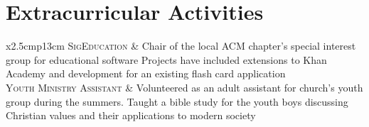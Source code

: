 \documentclass[letterpaper,10pt]{article}
\newcommand{\tbl}{2.5cm}
\newcommand{\tbr}{13cm}
\begin{document}
\section{Extracurricular Activities}
\begin{tabular}{x{\tbl}p{\tbr}}
    \textsc{SigEducation}
    & Chair of the local ACM chapter's special interest group for educational software \newline
    Projects have included extensions to Khan Academy and development for an
    existing flash card application \newline \\

    \textsc{Youth Ministry Assistant}
    & Volunteered as an adult assistant for church's youth group during the summers. \newline
    Taught a bible study for the youth boys discussing Christian values and their applications to modern society \newline \\

\end{tabular}




\end{document}
